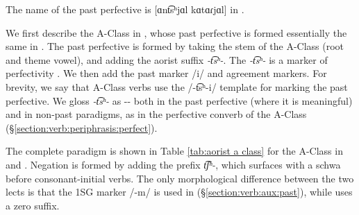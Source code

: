 The name of the past perfective is [ɑnt͡sʰjɑl kɑtɑɾjɑl]  in {\seaSEA}. 

We first describe the A-Class in {\iaIA}, whose past perfective is formed essentially the same in {\seaSE}. The past perfective is formed by taking the stem of the A-Class (root and theme vowel), and adding the aorist suffix \textit{{-t͡sʰ-}}. The \textit{{-t͡sʰ-}} is a marker of perfectivity \citep{Donabedian-2016-aoristModernArmenian}. We then add the past marker /{i}/ and agreement markers. For brevity, we say that A-Class verbs use the /-t͡sʰ-i/ template for marking the past perfective. We gloss \textit{-t͡sʰ-} as -{\aorperf}- both in  the past perfective (where it is meaningful) and in non-past paradigms, as in the perfective converb of the A-Class (\S\ref{section:verb:periphrasis:perfect}). 


The complete paradigm is shown in Table \ref{tab:aorist a class} for the A-Class in {\seaSE} and {\iaIA}. Negation is formed by adding the prefix \textit{{t͡ʃʰ-}}, which surfaces with a schwa before consonant-initial verbs. The only morphological difference between the two lects is that the 1SG marker /{-m}/ is used in {\iaIA} (\S\ref{section:verb:aux:past}), while {\seaSE} uses a zero suffix.\largerpage[2]

